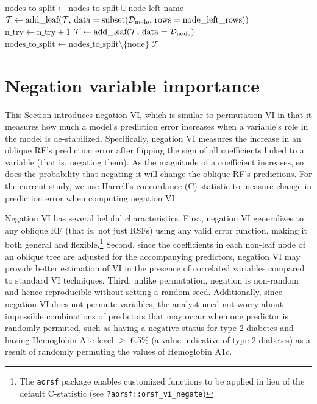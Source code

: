 \documentclass{article}\usepackage[]{graphicx}\usepackage[]{xcolor}
\newcommand{\dataset}{{\cal D}}
\newcommand{\ie}{that is}
\begin{document}
\begin{algorithm}
\begin{algorithmic}[1]
           \State $\text{nodes\_to\_split} \gets \text{nodes\_to\_split} \cup \text{node\_left\_name}$
         \Else
           \State $\mathcal{T} \gets \text{add\_leaf}(\mathcal{T},\, \text{data} = \text{subset}(\dataset_{\text{node}},\,\text{rows} = \text{node\_left\_rows}))$
         \EndIf
         \State $\text{n\_try} \gets \text{n\_try} + 1$
         \State {}
       \Else
         \State $\mathcal{T} \gets \text{add\_leaf}(\mathcal{T},\, \text{data} =\dataset_{\text{node}})$
       \EndIf
       \State $\text{nodes\_to\_split} \gets \text{nodes\_to\_split} \setminus \{\text{node}\}$
     \EndFor
  \EndWhile
  \State \Return $\mathcal{T}$
  \end{algorithmic}
\end{algorithm}

\section{Negation variable importance} \label{sec:negation_vi}

This Section introduces negation VI, which is similar to permutation VI in that it measures how much a model’s prediction error increases when a variable’s role in the model is de-stabilized. Specifically, negation VI measures the increase in an oblique RF's prediction error after flipping the sign of all coefficients linked to a variable (\ie, negating them). As the magnitude of a coefficient increases, so does the probability that negating it will change the oblique RF's predictions. For the current study, we use Harrell's concordance (C)-statistic \citep{harrell1982evaluating} to measure change in prediction error when computing negation VI.

Negation VI has several helpful characteristics. First, negation VI generalizes to any oblique RF (\ie, not just RSFs) using any valid error function, making it both general and flexible.\footnote{The \texttt{aorsf} package enables customized functions to be applied in lieu of the default C-statistic (see \texttt{?aorsf::orsf\_vi\_negate})} Second, since the coefficients in each non-leaf node of an oblique tree are adjusted for the accompanying predictors, negation VI may provide better estimation of VI in the presence of correlated variables compared to standard VI techniques. Third, unlike permutation, negation is non-random and hence reproducible without setting a random seed. Additionally, since negation VI does not permute variables, the analyst need not worry about impossible combinations of predictors that may occur when one predictor is randomly permuted, such as having a negative status for type 2 diabetes and having Hemoglobin A1c level $\geq$ 6.5\% (a value indicative of type 2 diabetes) as a result of randomly permuting the values of Hemoglobin A1c.
\end{document}
